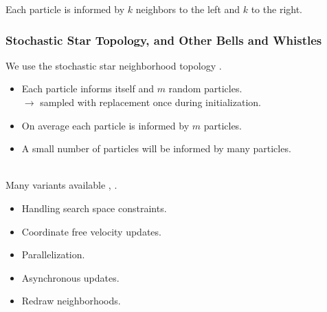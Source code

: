 \documentclass[xcolor=dvipsnames]{beamer}
\begin{document}
\begin{frame}
\begin{figure}
{
  }
  {
  }
\end{figure}
Each particle is informed by $k$ neighbors to the left and $k$ to the right.
\end{frame}

\begin{frame}
\frametitle{Stochastic Star Topology, and Other Bells and Whistles}
We use the stochastic star neighborhood topology \citep{miranda2008stochastic}.
\begin{itemize}
\item Each particle informs itself and $m$ random particles.\\
$\to$ sampled with replacement once during initialization.
\item On average each particle is informed by $m$ particles.
\item A small number of particles will be informed by many particles.\\~\\
\end{itemize}

\pause

Many variants available \citep{clerc2011spso}, \citep[][appendix]{simpson2017adaptively}.
\begin{itemize}
\item Handling search space constraints.
\item Coordinate free velocity updates.
\item Parallelization.
\item Asynchronous updates.
\item Redraw neighborhoods.
\end{itemize}
\end{frame}
\end{document}
